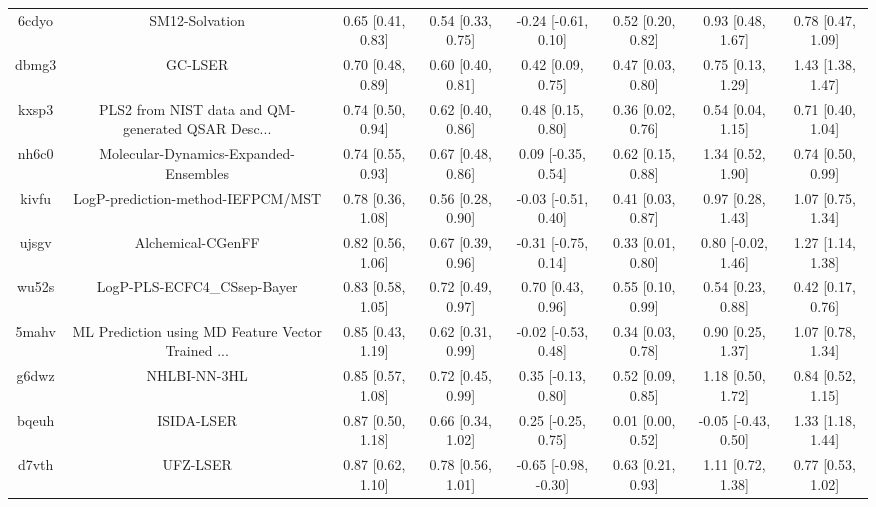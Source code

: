 \documentclass{article}
\begin{document}
\begin{center}
\begin{longtable}{|cccccccc|}
 6cdyo &                                     SM12-Solvation &  0.65 [0.41, 0.83] &  0.54 [0.33, 0.75] &   -0.24 [-0.61, 0.10] &  0.52 [0.20, 0.82] &    0.93 [0.48, 1.67] &     0.78 [0.47, 1.09] \\
 dbmg3 &                                            GC-LSER &  0.70 [0.48, 0.89] &  0.60 [0.40, 0.81] &     0.42 [0.09, 0.75] &  0.47 [0.03, 0.80] &    0.75 [0.13, 1.29] &     1.43 [1.38, 1.47] \\
 kxsp3 &  PLS2 from NIST data and QM-generated QSAR Desc... &  0.74 [0.50, 0.94] &  0.62 [0.40, 0.86] &     0.48 [0.15, 0.80] &  0.36 [0.02, 0.76] &    0.54 [0.04, 1.15] &     0.71 [0.40, 1.04] \\
 nh6c0 &              Molecular-Dynamics-Expanded-Ensembles &  0.74 [0.55, 0.93] &  0.67 [0.48, 0.86] &    0.09 [-0.35, 0.54] &  0.62 [0.15, 0.88] &    1.34 [0.52, 1.90] &     0.74 [0.50, 0.99] \\
 kivfu &                  LogP-prediction-method-IEFPCM/MST &  0.78 [0.36, 1.08] &  0.56 [0.28, 0.90] &   -0.03 [-0.51, 0.40] &  0.41 [0.03, 0.87] &    0.97 [0.28, 1.43] &     1.07 [0.75, 1.34] \\
 ujsgv &                                  Alchemical-CGenFF &  0.82 [0.56, 1.06] &  0.67 [0.39, 0.96] &   -0.31 [-0.75, 0.14] &  0.33 [0.01, 0.80] &   0.80 [-0.02, 1.46] &     1.27 [1.14, 1.38] \\
 wu52s &                        LogP-PLS-ECFC4\_CSsep-Bayer &  0.83 [0.58, 1.05] &  0.72 [0.49, 0.97] &     0.70 [0.43, 0.96] &  0.55 [0.10, 0.99] &    0.54 [0.23, 0.88] &     0.42 [0.17, 0.76] \\
 5mahv &  ML Prediction using MD Feature Vector Trained ... &  0.85 [0.43, 1.19] &  0.62 [0.31, 0.99] &   -0.02 [-0.53, 0.48] &  0.34 [0.03, 0.78] &    0.90 [0.25, 1.37] &     1.07 [0.78, 1.34] \\
 g6dwz &                                       NHLBI-NN-3HL &  0.85 [0.57, 1.08] &  0.72 [0.45, 0.99] &    0.35 [-0.13, 0.80] &  0.52 [0.09, 0.85] &    1.18 [0.50, 1.72] &     0.84 [0.52, 1.15] \\
 bqeuh &                                         ISIDA-LSER &  0.87 [0.50, 1.18] &  0.66 [0.34, 1.02] &    0.25 [-0.25, 0.75] &  0.01 [0.00, 0.52] &  -0.05 [-0.43, 0.50] &     1.33 [1.18, 1.44] \\
 d7vth &                                           UFZ-LSER &  0.87 [0.62, 1.10] &  0.78 [0.56, 1.01] &  -0.65 [-0.98, -0.30] &  0.63 [0.21, 0.93] &    1.11 [0.72, 1.38] &     0.77 [0.53, 1.02] \\

\end{longtable}
\end{center}
\end{document}
